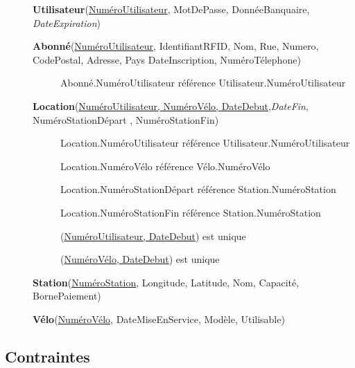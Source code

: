 \documentclass[a4paper,10pt]{article}
\begin{document}
\begin{description}
\item[] \textbf{Utilisateur}(\underline{NuméroUtilisateur}, MotDePasse, DonnéeBanquaire, \textit{DateExpiration})

\item[] \textbf{Abonné}(\underline{NuméroUtilisateur}, IdentifiantRFID, Nom, Rue, Numero, CodePostal, Adresse, Pays DateInscription, NuméroTélephone)
	\begin{description}
	\item[] Abonné.NuméroUtilisateur référence Utilisateur.NuméroUtilisateur
	\end{description}

\item[] \textbf{Location}(\underline{NuméroUtilisateur, NuméroVélo, DateDebut},\textit{DateFin}, NuméroStationDépart , NuméroStationFin) %
	\begin{description}
	\item[] Location.NuméroUtilisateur référence Utilisateur.NuméroUtilisateur
	\item[] Location.NuméroVélo référence Vélo.NuméroVélo
	\item[] Location.NuméroStationDépart référence Station.NuméroStation
	\item[] Location.NuméroStationFin référence Station.NuméroStation
	\item[] (\underline{NuméroUtilisateur, DateDebut}) est unique
	\item[] (\underline{NuméroVélo, DateDebut}) est unique
	\end{description}
	
\item[] \textbf{Station}(\underline{NuméroStation}, Longitude, Latitude, Nom, Capacité, BornePaiement)

\item[] \textbf{Vélo}(\underline{NuméroVélo}, DateMiseEnService, Modèle, Utilisable)

\end{description}

\subsection{Contraintes}
\end{document}
